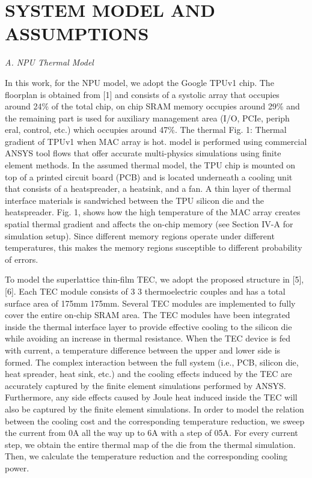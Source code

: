 \documentclass[sigconf]{acmart}
\begin{document}
\section{SYSTEM MODEL AND ASSUMPTIONS}
\textit{A. NPU Thermal Model}

In this work, for the NPU model, we adopt the Google TPUv1 chip. The floorplan is obtained from [1] and consists of a systolic array that occupies around 24\% of the total chip, on chip SRAM memory occupies around 29\% and the remaining part is used for auxiliary management area (I/O, PCIe, periph eral, control, etc.) which occupies around 47\%. The thermal Fig. 1: Thermal gradient of TPUv1 when MAC array is hot. model is performed using commercial ANSYS tool flows that offer accurate multi-physics simulations using finite element methods. In the assumed thermal model, the TPU chip is mounted on top of a printed circuit board (PCB) and is located underneath a cooling unit that consists of a heatspreader, a heatsink, and a fan. A thin layer of thermal interface materials is sandwiched between the TPU silicon die and the heatspreader. Fig. 1, shows how the high temperature of the MAC array creates spatial thermal gradient and affects the on-chip memory (see Section IV-A for simulation setup). Since different memory regions operate under different temperatures, this makes the memory regions susceptible to different probability of errors.

To model the superlattice thin-film TEC, we adopt the proposed structure in [5], [6]. Each TEC module consists of 3 3 thermoelectric couples and has a total surface area of 175mm 175mm. Several TEC modules are implemented to fully cover the entire on-chip SRAM area. The TEC modules have been integrated inside the thermal interface layer to provide effective cooling to the silicon die while avoiding an increase in thermal resistance. When the TEC device is fed with current, a temperature difference between the upper and lower side is formed. The complex interaction between the full system (i.e., PCB, silicon die, heat spreader, heat sink, etc.) and the cooling effects induced by the TEC are accurately captured by the finite element simulations performed by ANSYS. Furthermore, any side effects caused by Joule heat induced inside the TEC will also be captured by the finite element simulations. In order to model the relation between the cooling cost and the corresponding temperature reduction, we sweep the current from 0A all the way up to 6A with a step of 05A. For every current step, we obtain the entire thermal map of the die from the thermal simulation. Then, we calculate the temperature reduction and the corresponding cooling power.\\
\end{document}
